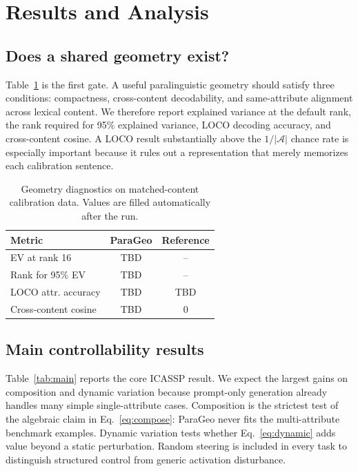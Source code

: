 \documentclass{article}
\newcommand{\GeometryLOCO}{TBD}
\newcommand{\GeometryChance}{TBD}
\newcommand{\GeometryCosine}{TBD}
\newcommand{\GeometryEV}{TBD}
\newcommand{\GeometryRank}{TBD}
\begin{document}
\section{Results and Analysis}
\subsection{Does a shared geometry exist?}
Table~\ref{tab:geometry} is the first gate. A useful paralinguistic geometry should satisfy three conditions: compactness, cross-content decodability, and same-attribute alignment across lexical content. We therefore report explained variance at the default rank, the rank required for 95\% explained variance, LOCO decoding accuracy, and cross-content cosine. A LOCO result substantially above the $1/|\mathcal{A}|$ chance rate is especially important because it rules out a representation that merely memorizes each calibration sentence.

\begin{table}[t]
\centering
\caption{Geometry diagnostics on matched-content calibration data. Values are filled automatically after the run.}
\label{tab:geometry}
\setlength{\tabcolsep}{4.0pt}
\begin{tabular}{lcc}
\toprule
Metric & ParaGeo & Reference \\
\midrule
EV at rank 16 & \GeometryEV & -- \\
Rank for 95\% EV & \GeometryRank & -- \\
LOCO attr. accuracy & \GeometryLOCO & \GeometryChance \\
Cross-content cosine & \GeometryCosine & $0$ \\
\bottomrule
\end{tabular}
\end{table}

\subsection{Main controllability results}
Table~\ref{tab:main} reports the core ICASSP result. We expect the largest gains on composition and dynamic variation because prompt-only generation already handles many simple single-attribute cases. Composition is the strictest test of the algebraic claim in Eq.~\eqref{eq:compose}: ParaGeo never fits the multi-attribute benchmark examples. Dynamic variation tests whether Eq.~\eqref{eq:dynamic} adds value beyond a static perturbation. Random steering is included in every task to distinguish structured control from generic activation disturbance.
\end{document}
